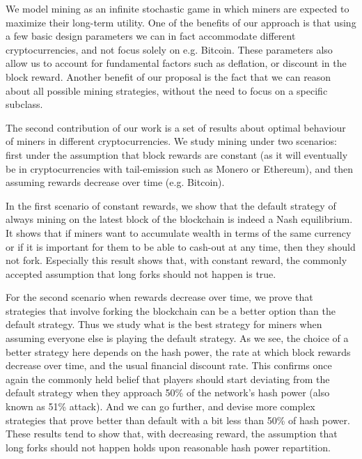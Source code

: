 \smallskip
{}  We model mining as an infinite stochastic game in which miners are expected to maximize their long-term utility. One of the benefits of our approach is that using  a few basic design parameters we can in fact accommodate different cryptocurrencies, and not focus solely on e.g. Bitcoin. These parameters also allow us to account for fundamental factors such as deflation, or discount in the block reward. Another benefit of our proposal is the fact that we can reason about all possible mining strategies, without the need to focus on a specific subclass. 

The second contribution of our work is a set of results about optimal behaviour of miners in different cryptocurrencies. We study mining under two scenarios: 
first under the assumption that block rewards are constant (as it will eventually be in cryptocurrencies with tail-emission such as Monero or Ethereum), and then 
assuming rewards decrease over time (e.g. Bitcoin). 

In the first scenario of constant rewards, we show that the default strategy of always mining on the latest block of the blockchain is indeed a Nash equilibrium.
It shows that if miners want to accumulate wealth in terms of the same currency  or if it is important for them to be able to cash-out at any time, then they should not fork. Especially this result shows that, with constant reward, the commonly accepted assumption that long forks should not happen is true. 

For the second scenario when rewards decrease over time, we prove that strategies that involve forking the blockchain
can be a better option than the default strategy. 
Thus we study what is the best strategy for miners when assuming everyone else is playing the default strategy. As we see, the 
choice of a better strategy here depends on the hash power, the rate at which 
block rewards decrease over time, and the usual financial discount rate. This confirms once again the commonly held belief that
players should start deviating from the default strategy 
when they approach 50\% of the network's hash power (also known as 51\% attack). And we can go further, and devise more complex strategies that 
prove better than default with a bit less than 50\% of hash power. 
These results tend to show that, with decreasing reward, the assumption that long forks should not happen holds upon reasonable hash power repartition.

